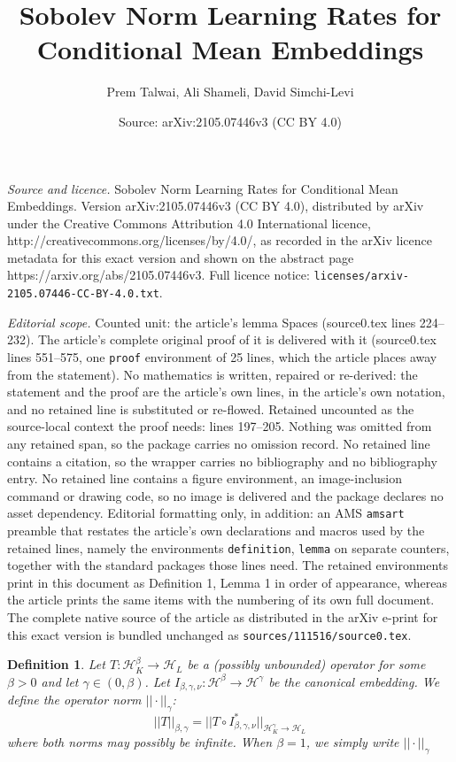 \documentclass[10pt,a4paper]{amsart}
\title{Sobolev Norm Learning Rates for Conditional Mean Embeddings}
\author{Prem Talwai, Ali Shameli, David Simchi-Levi}
\date{Source: arXiv:2105.07446v3 (CC BY 4.0)}
\newtheorem{definition}{Definition}
\begin{document}
\maketitle

\noindent\emph{Source and licence.} Sobolev Norm Learning Rates for Conditional Mean Embeddings. Version arXiv:2105.07446v3 (CC BY 4.0), distributed by arXiv under the Creative Commons Attribution 4.0 International licence, http://creativecommons.org/licenses/by/4.0/, as recorded in the arXiv licence metadata for this exact version and shown on the abstract page https://arxiv.org/abs/2105.07446v3. Full licence notice: \texttt{licenses/arxiv-2105.07446-CC-BY-4.0.txt}.\par\smallskip

\noindent\textit{Editorial scope.} Counted unit: the article's lemma Spaces (source0.tex lines 224--232). The article's complete original proof of it is delivered with it (source0.tex lines 551--575, one \texttt{proof} environment of 25 lines, which the article places away from the statement). No mathematics is written, repaired or re-derived: the statement and the proof are the article's own lines, in the article's own notation, and no retained line is substituted or re-flowed.  Retained uncounted as the source-local context the proof needs: lines 197--205.  Nothing was omitted from any retained span, so the package carries no omission record.  No retained line contains a citation, so the wrapper carries no bibliography and no bibliography entry.  No retained line contains a figure environment, an image-inclusion command or drawing code, so no image is delivered and the package declares no asset dependency.  Editorial formatting only, in addition: an AMS \texttt{amsart} preamble that restates the article's own declarations and macros used by the retained lines, namely the environments \texttt{definition}, \texttt{lemma} on separate counters, together with the standard packages those lines need.  The retained environments print in this document as Definition 1, Lemma 1 in order of appearance, whereas the article prints the same items with the numbering of its own full document.  The complete native source of the article as distributed in the arXiv e-print for this exact version is bundled unchanged as \texttt{sources/111516/source0.tex}.
\begin{definition}
\label{Sobolev Norm}
Let $T: \mathcal{H}^{\beta}_K \to \mathcal{H}_L$ be a (possibly unbounded) operator for some $\beta > 0$ and let $\gamma \in (0, \beta)$. Let $I_{\beta, \gamma, \nu}: \mathcal{H}^{\beta} \to \mathcal{H}^{\gamma}$ be the canonical embedding. We define the operator norm $||\cdot||_{\gamma}$:
\begin{equation*}
\label{Sobolev Norm Formula}
    ||T||_{\beta, \gamma} = ||T \circ I^{*}_{\beta, \gamma, \nu}||_{\mathcal{H}^{\gamma}_{K} \to \mathcal{H}_L}
\end{equation*}
where both norms may possibly be infinite. When $\beta = 1$, we simply write $||\cdot||_{\gamma}$
\end{definition}
\end{document}
